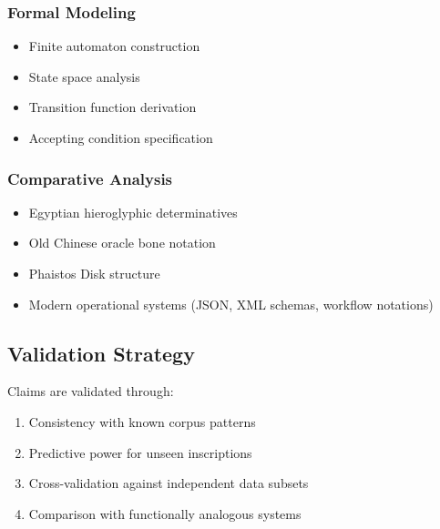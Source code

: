 \subsubsection{Formal Modeling}
\begin{itemize}
    \item Finite automaton construction
    \item State space analysis
    \item Transition function derivation
    \item Accepting condition specification
\end{itemize}

\subsubsection{Comparative Analysis}
\begin{itemize}
    \item Egyptian hieroglyphic determinatives
    \item Old Chinese oracle bone notation
    \item Phaistos Disk structure
    \item Modern operational systems (JSON, XML schemas, workflow notations)
\end{itemize}

\subsection{Validation Strategy}

Claims are validated through:
\begin{enumerate}
    \item Consistency with known corpus patterns
    \item Predictive power for unseen inscriptions
    \item Cross-validation against independent data subsets
    \item Comparison with functionally analogous systems
\end{enumerate}
